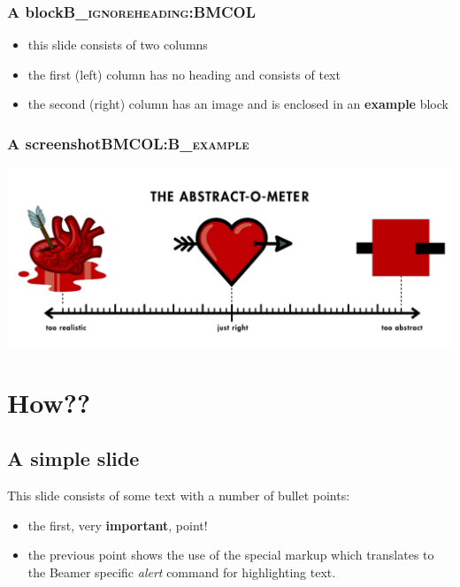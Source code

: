 \documentclass[bigger]{beamer}
\begin{document}
\subsubsection{A block\hfill{}\textsc{B\_ignoreheading:BMCOL}}
\label{sec:org85e9ee4}
\begin{itemize}
\item this slide consists of two columns
\item the first (left) column has no heading and consists of text
\item the second (right) column has an image and is enclosed in an
\textbf{example} block
\end{itemize}

\subsubsection{A screenshot\hfill{}\textsc{BMCOL:B\_example}}
\label{sec:org36563c4}
\begin{center}
\includegraphics[width=.9\linewidth]{./screenshots/abstract-o-meter.png}
\end{center}

\section{How??}
\label{sec:org689c4ed}
\subsection{A simple slide}
\label{sec:orgc7d98dd}
This slide consists of some text with a number of bullet points:

\begin{itemize}
\item the first, very \textbf{important}, point!
\item the previous point shows the use of the special markup which
translates to the Beamer specific \emph{alert} command for highlighting
text.
\end{itemize}
\end{document}
